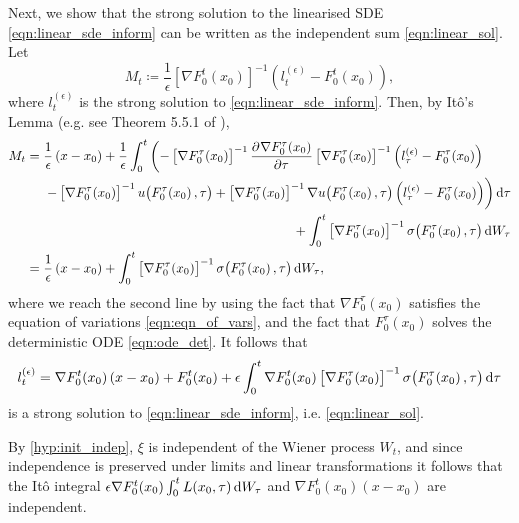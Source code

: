 Next, we show that the strong solution to the linearised SDE \eqref{eqn:linear_sde_inform} can be written as the independent sum \eqref{eqn:linear_sol}.
Let
\[
	M_t \coloneqq \frac{1}{\epsilon}\left[\nabla F_0^t\!\left(x_0\right)\right]^{-1}\left(l_t^{(\epsilon)} - F_0^t\!\left(x_0\right)\right),
\]
where \(l_t^{(\epsilon)}\) is the strong solution to \eqref{eqn:linear_sde_inform}.
Then, by It\^o's Lemma (e.g. see Theorem 5.5.1 of \cite{KallianpurSundar_2014_StochasticAnalysisDiffusion}),
\begin{align*}
	M_t & = \begin{multlined}[t]
		        \frac{1}{\epsilon}\left(x - x_0\right) + \frac{1}{\epsilon}\int_0^t\left(-\left[\nabla F_0^\tau\!\left(x_0\right)\right]^{-1} \dpd{\nabla F_0^\tau\!\left(x_0\right)}{\tau}\left[\nabla F_0^\tau\!\left(x_0\right)\right]^{-1}\left(l_\tau^{(\epsilon)} - F_0^\tau\!\left(x_0\right) \right)\right. \\
		        \left. - \left[\nabla F_0^\tau\!\left(x_0\right)\right]^{-1}u\!\left(F_0^\tau\!\left(x_0\right), \tau\right) + \left[\nabla F_0^\tau\!\left(x_0\right)\right]^{-1}\nabla u\!\left(F_0^\tau\!\left(x_0\right), \tau\right) \left(l_\tau^{(\epsilon)} - F_0^\tau\!\left(x_0\right)\right) \right)\dif\tau \\
		        + \int_0^t{\left[\nabla F_0^\tau\!\left(x_0\right)\right]^{-1}\sigma\!\left(F_0^\tau\!\left(x_0\right), \tau\right)\dif W_\tau}
	        \end{multlined} \\
	    & = \frac{1}{\epsilon}\left(x - x_0\right) + \int_0^t{\left[\nabla F_0^\tau\!\left(x_0\right)\right]^{-1}\sigma\!\left(F_0^\tau\!\left(x_0\right), \tau\right)\dif W_\tau},
\end{align*}
where we reach the second line by using the fact that \(\nabla F_0^\tau\!\left(x_0\right)\) satisfies the equation of variations \eqref{eqn:eqn_of_vars}, and the fact that \(F_0^\tau\!\left(x_0\right)\) solves the deterministic ODE \eqref{eqn:ode_det}.
It follows that
\[
	l_t^{(\epsilon)} = \nabla F_0^t\!\left(x_0\right)\left(x - x_0\right) +  F_0^t\!\left(x_0\right) + \epsilon\int_0^t{\nabla F_0^t\!\left(x_0\right)\left[\nabla F_0^\tau\!\left(x_0\right)\right]^{-1} \sigma\!\left(F_0^\tau\!\left(x_0\right), \tau\right)\dif \tau}
\]
is a strong solution to \eqref{eqn:linear_sde_inform}, i.e. \eqref{eqn:linear_sol}.

By \eqref{hyp:init_indep}, \(\xi\) is independent of the Wiener process \(W_t\), and since independence is preserved under limits and linear transformations it follows that the It\^o integral \(\epsilon \nabla F_0^t\!\left(x_0\right)\int_0^t{L\!\left(x_0, \tau\right)\dif W_\tau}\) and \(\nabla F_0^t\!\left(x_0\right)\left(x - x_0\right)\) are independent.

